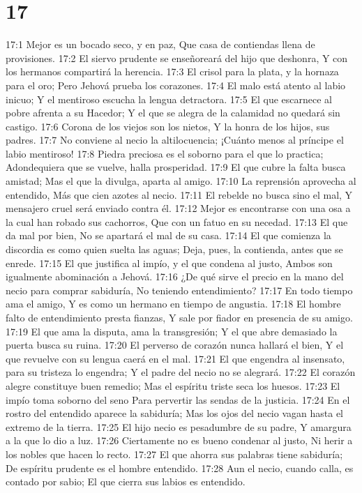 \chapter{17}


17:1 Mejor es un bocado seco, y en paz,  
Que casa de contiendas llena de provisiones.  
17:2 El siervo prudente se enseñoreará del hijo que deshonra,  
Y con los hermanos compartirá la herencia.  
17:3 El crisol para la plata, y la hornaza para el oro;  
Pero Jehová prueba los corazones.  
17:4 El malo está atento al labio inicuo;  
Y el mentiroso escucha la lengua detractora.  
17:5 El que escarnece al pobre afrenta a su Hacedor;  
Y el que se alegra de la calamidad no quedará sin castigo.  
17:6 Corona de los viejos son los nietos,  
Y la honra de los hijos, sus padres.  
17:7 No conviene al necio la altilocuencia;  
¡Cuánto menos al príncipe el labio mentiroso!  
17:8 Piedra preciosa es el soborno para el que lo practica;  
Adondequiera que se vuelve, halla prosperidad.  
17:9 El que cubre la falta busca amistad;  
Mas el que la divulga, aparta al amigo.  
17:10 La reprensión aprovecha al entendido,  
Más que cien azotes al necio.  
17:11 El rebelde no busca sino el mal,  
Y mensajero cruel será enviado contra él.  
17:12 Mejor es encontrarse con una osa a la cual han robado sus cachorros,  
Que con un fatuo en su necedad.  
17:13 El que da mal por bien,  
No se apartará el mal de su casa.  
17:14 El que comienza la discordia es como quien suelta las aguas; 
Deja, pues, la contienda, antes que se enrede.  
17:15 El que justifica al impío, y el que condena al justo,  
Ambos son igualmente abominación a Jehová.  
17:16 ¿De qué sirve el precio en la mano del necio para comprar sabiduría,  
No teniendo entendimiento?  
17:17 En todo tiempo ama el amigo,  
Y es como un hermano en tiempo de angustia. 
17:18 El hombre falto de entendimiento presta fianzas,  
Y sale por fiador en presencia de su amigo.  
17:19 El que ama la disputa, ama la transgresión;  
Y el que abre demasiado la puerta busca su ruina.  
17:20 El perverso de corazón nunca hallará el bien,  
Y el que revuelve con su lengua caerá en el mal.  
17:21 El que engendra al insensato, para su tristeza lo engendra;  
Y el padre del necio no se alegrará.  
17:22 El corazón alegre constituye buen remedio;  
Mas el espíritu triste seca los huesos.  
17:23 El impío toma soborno del seno  
Para pervertir las sendas de la justicia.  
17:24 En el rostro del entendido aparece la sabiduría;  
Mas los ojos del necio vagan hasta el extremo de la tierra.  
17:25 El hijo necio es pesadumbre de su padre,  
Y amargura a la que lo dio a luz.  
17:26 Ciertamente no es bueno condenar al justo,  
Ni herir a los nobles que hacen lo recto.  
17:27 El que ahorra sus palabras tiene sabiduría;  
De espíritu prudente es el hombre entendido.  
17:28 Aun el necio, cuando calla, es contado por sabio;  
El que cierra sus labios es entendido. 

